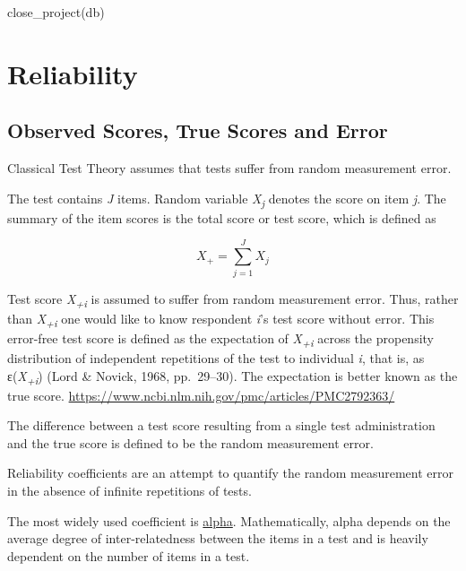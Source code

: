 \documentclass[
  letterpaper,
  DIV=11,
  numbers=noendperiod]{scrreprt}
\newenvironment{Shaded}{\begin{snugshade}}{\end{snugshade}}
\newcommand{\FunctionTok}[1]{\textcolor[rgb]{0.28,0.35,0.67}{#1}}
\newcommand{\NormalTok}[1]{\textcolor[rgb]{0.00,0.23,0.31}{#1}}
\begin{document}
\begin{Shaded}
\begin{Highlighting}[]
\FunctionTok{close\_project}\NormalTok{(db)}
\end{Highlighting}
\end{Shaded}

\hypertarget{reliability}{%
\chapter{Reliability}\label{reliability}}

\hypertarget{observed-scores-true-scores-and-error}{%
\section{Observed Scores, True Scores and
Error}\label{observed-scores-true-scores-and-error}}

Classical Test Theory assumes that tests suffer from random measurement
error.

The test contains \emph{J} items. Random variable
\emph{X\textsubscript{j}} denotes the score on item \emph{j}. The
summary of the item scores is the total score or test score, which is
defined as

\[
X_+ = \sum_{j=1}^J X_j
\]

Test score \emph{X\textsubscript{+i}} is assumed to suffer from random
measurement error. Thus, rather than \emph{X\textsubscript{+i}} one
would like to know respondent \emph{i}'s test score without error. This
error-free test score is defined as the expectation of
\emph{X\textsubscript{+i}} across the propensity distribution of
independent repetitions of the test to individual \emph{i}, that is, as
ɛ(\emph{X\textsubscript{+i}}) (Lord \& Novick, 1968, pp.~29--30). The
expectation is better known as the true score.
\url{https://www.ncbi.nlm.nih.gov/pmc/articles/PMC2792363/}

The difference between a test score resulting from a single test
administration and the true score is defined to be the random
measurement error.

Reliability coefficients are an attempt to quantify the random
measurement error in the absence of infinite repetitions of tests.

The most widely used coefficient is
\href{https://link.springer.com/article/10.1007/bf02310555}{alpha}.
Mathematically, alpha depends on the average degree of inter-relatedness
between the items in a test and is heavily dependent on the number of
items in a test.
\end{document}
